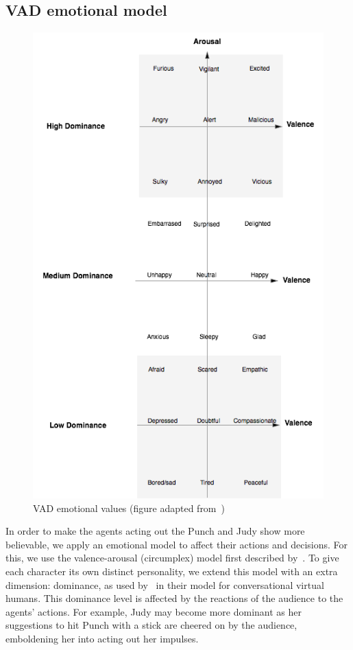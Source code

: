 \documentclass[11pt]{report}
\begin{document}
\subsection{VAD emotional model} \label{sec:emotion}
\begin{figure}[!t]
  \centering
  \includegraphics[height=0.6\textheight]{VAD.png}
\caption{VAD emotional values (figure adapted from~\citet{ahn2012nvc})} \label{fig:vad}
\end{figure}

In order to make the agents acting out the Punch and Judy show more believable,
we apply an emotional model to affect their actions and decisions. For this, we
use the valence-arousal (circumplex) model first described
by~\citet{russell1980circumplex}. To give each character its own distinct
personality, we extend this model with an extra dimension: dominance, as used
by~\citet{ahn2012nvc} in their model for conversational virtual humans. This
dominance level is affected by the reactions of the audience to the agents'
actions. For example, Judy may become more dominant as her suggestions to hit
Punch with a stick are cheered on by the audience, emboldening her into acting
out her impulses.
\end{document}
